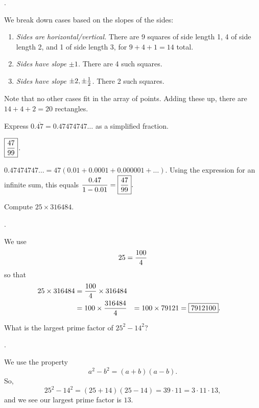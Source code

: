 \documentclass[11pt]{article}
\DeclareRobustCommand{\frac}[3][0pt]{%
  {\begingroup\hspace{#1}#2\hspace{#1}\endgroup\over\hspace{#1}#3\hspace{#1}}}
\begin{document}
\begin{answer} . \end{answer}
\begin{solution}
We break down cases based on the slopes of the sides:
\begin{enumerate}
\item \emph{Sides are horizontal/vertical.} There are 9 squares of side length 1, 4 of side length 2, and 1 of side length 3, for $9 + 4 + 1 = 14$ total.
\item \emph{Sides have slope $\pm 1$.} There are 4 such squares.
\item \emph{Sides have slope $\pm 2, \pm \frac{1}{2}$.} There 2 such squares.
\end{enumerate}
Note that no other cases fit in the array of points. Adding these up, there are $14 + 4 + 2 = \boxed{20}$ rectangles.
\end{solution}

\begin{problem}Express $0.\overline{47} = 0.47474747\ldots$ as a simplified fraction.
\end{problem}

\begin{answer} $\boxed{\displaystyle \frac{47}{99}}$. \end{answer}

\begin{solution}
$\displaystyle 0.47474747\ldots = 47(0.01 + 0.0001 + 0.000001 + \ldots)$. Using the expression for an infinite sum, this equals $\displaystyle \frac{0.47}{1 - 0.01} = \boxed{\frac{47}{99}}.$
\end{solution}


\begin{problem}Compute $25 \times 316484$.
\end{problem}
\begin{answer}
.
\end{answer}
\begin{solution}
We use
$$25 = \frac{100}{4}$$
so that
\begin{align*}
25 \times 316484 &= \frac{100}{4} \times 316484 \\
&= 100 \times \frac{316484}{4}
&= 100 \times 79121
&= \boxed{7912100}.
\end{align*}
\end{solution}

\begin{problem}What is the largest prime factor of $25^2-14^2$?
\end{problem}
\begin{answer}
.
\end{answer}
\begin{solution}
We use the property
$$a^2-b^2 = (a+b)(a-b).$$
So,
$$25^2-14^2 = (25+14)(25-14) = 39 \cdot 11 = 3 \cdot 11 \cdot 13,$$
and we see our largest prime factor is $\boxed{13}$.

\end{solution}
\end{document}
